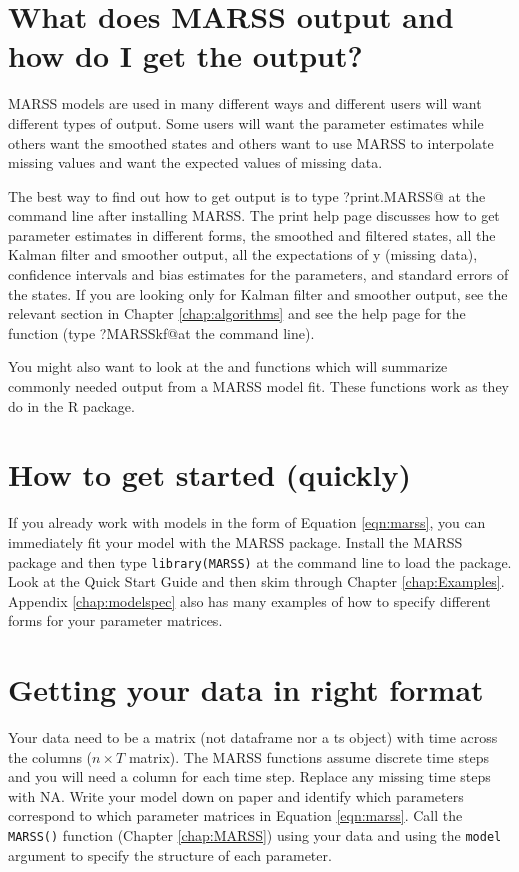 \section{What does MARSS output and how do I get the output?}
MARSS models are used in many different ways and different users will want different types of output.  Some users will want the parameter estimates while others want the smoothed states and others want to use MARSS to interpolate missing values and want the expected values of missing data.  

The best way to find out how to get output is to type \verb@?print.MARSS@ at the command line after installing MARSS.  The print help page discusses how to get parameter estimates in different forms, the smoothed and filtered states, all the Kalman filter and smoother output, all the expectations of y (missing data), confidence intervals and bias estimates for the parameters, 
and standard errors of the states.  If you are looking only for Kalman filter and smoother output, see the relevant section in Chapter \ref{chap:algorithms} and see the help page for the \verb@MARSSkf@ function (type \verb@?MARSSkf@at the \R command line).

You might also want to look at the \verb@tidy@ and \verb@glance@ functions which will summarize commonly needed output from a MARSS model fit.  These functions work as they do in the \verb@broom@ R package.

\section{How to get started (quickly)}

If you already work with models in the form of Equation \ref{eqn:marss}, you can immediately fit your model with the MARSS package.  Install the MARSS package and then type \texttt{library(MARSS)} at the command line to load the package.  Look at the Quick Start Guide and then skim through Chapter \ref{chap:Examples}.  Appendix \ref{chap:modelspec} also has many examples of how to specify different forms for your parameter matrices. 

\section{Getting your data in right format}
Your data need to be a matrix (not dataframe nor a ts object) with time across the columns ($n \times T$ matrix).  The MARSS functions assume discrete time steps and you will need a column for each time step.  Replace any missing time steps with NA.  Write your model down on paper and identify which parameters correspond to which parameter matrices in Equation \ref{eqn:marss}.  Call the \texttt{MARSS()} function (Chapter \ref{chap:MARSS}) using your data and using the \texttt{model} argument to specify the structure of each parameter. 

